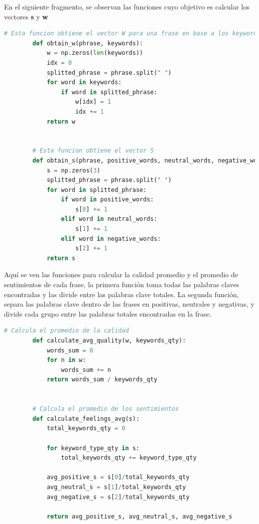 \documentclass{article}
\begin{document}
    \newpage

    En el siguiente fragmento, se observan las funciones cuyo objetivo es calcular los vectores \textbf{s} y \textbf{w}

    \begin{lstlisting}[language=Python]
        # Esta funcion obtiene el vector W para una frase en base a los keywords
        def obtain_w(phrase, keywords):
            w = np.zeros(len(keywords))
            idx = 0
            splitted_phrase = phrase.split(" ")
            for word in keywords:
                if word in splitted_phrase:
                    w[idx] = 1
                    idx += 1
            return w


        # Esta funcion obtiene el vector S
        def obtain_s(phrase, positive_words, neutral_words, negative_words):
            s = np.zeros(3)
            splitted_phrase = phrase.split(" ")
            for word in splitted_phrase:
                if word in positive_words:
                    s[0] += 1
                elif word in neutral_words:
                    s[1] += 1
                elif word in negative_words:
                    s[2] += 1
            return s

    \end{lstlisting}

    \newpage

    Aquí se ven las funciones para calcular la calidad promedio y el promedio de sentimientos de cada frase, la primera función toma todas las palabras claves encontradas y las divide entre las palabras clave totales.
    La segunda función, separa las palabras clave dentro de las frases en positivas, neutrales y negativas, y divide cada grupo entre las palabras totales encontradas en la frase.

    \begin{lstlisting}[language=Python]
        # Calcula el promedio de la calidad
        def calculate_avg_quality(w, keywords_qty):
            words_sum = 0
            for n in w:
                words_sum += n
            return words_sum / keywords_qty


        # Calcula el promedio de los sentimientos
        def calculate_feelings_avg(s):
            total_keywords_qty = 0

            for keyword_type_qty in s:
                total_keywords_qty += keyword_type_qty

            avg_positive_s = s[0]/total_keywords_qty
            avg_neutral_s = s[1]/total_keywords_qty
            avg_negative_s = s[2]/total_keywords_qty

            return avg_positive_s, avg_neutral_s, avg_negative_s
    \end{lstlisting}
\end{document}
